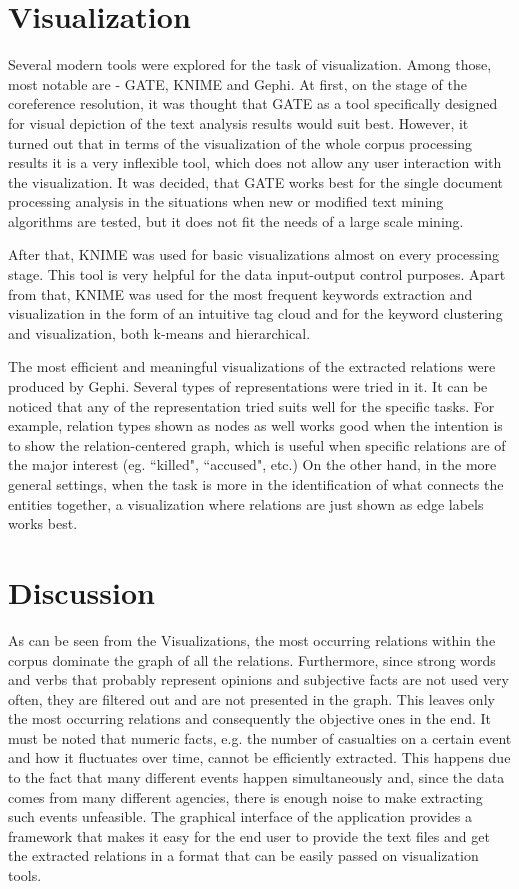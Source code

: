 \documentclass[]{article}
\begin{document}
\section{Visualization}
%
Several modern tools were explored for the task of visualization. Among those, most notable are - GATE\cite{gate}, KNIME\cite{knime} and Gephi\cite{gephi}. At first, on the stage of the coreference resolution, it was thought that GATE as a tool specifically designed for visual depiction of the text analysis results would suit best. However, it turned out that in terms of the visualization of the whole corpus processing results it is a very inflexible tool, which does not allow any user interaction with the visualization. It was decided, that GATE works best for the single document processing analysis in the situations when new or modified text mining algorithms are tested, but it does not fit the needs of a large scale mining.

After that, KNIME was used for basic visualizations almost on every processing stage. This tool is very helpful for the data input-output control purposes. Apart from that, KNIME was used for the most frequent keywords extraction and visualization in the form of an intuitive tag cloud and for the keyword clustering and visualization, both k-means and hierarchical.

The most efficient and meaningful visualizations of the extracted relations were produced by Gephi. Several types of representations were tried in it. It can be noticed that any of the representation tried suits well for the specific tasks. For example, relation types shown as nodes as well works good when the intention is to show the relation-centered graph, which is useful when specific relations are of the major interest (eg. ``killed", ``accused", etc.) On the other hand, in the more general settings, when the task is more in the identification of what connects the entities together, a visualization where relations are just shown as edge labels works best.
% 
\section{Discussion}
%
As can be seen from the Visualizations, the most occurring relations within the corpus dominate the graph of all the relations. Furthermore, since strong words and verbs that probably represent opinions and subjective facts are not used very often, they are filtered out and are not presented in the graph. This leaves only the most occurring relations and consequently the objective ones in the end. It must be noted that numeric facts, e.g. the number of casualties on a certain event and how it fluctuates over time, cannot be efficiently extracted. This happens due to the fact that many different events happen simultaneously and, since the data comes from many different agencies, there is enough noise to make extracting such events unfeasible. The graphical interface of the application provides a framework that makes it easy for the end user to provide the text files and get the extracted relations in a format that can be easily passed on visualization tools. 
\end{document}
